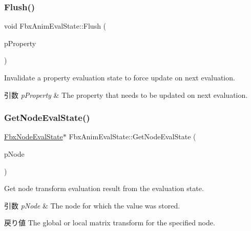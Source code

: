 \subsubsection{\texorpdfstring{Flush()}{Flush()}\hspace{0.1cm}{\footnotesize\ttfamily [2/2]}}
{\footnotesize\ttfamily void Fbx\+Anim\+Eval\+State\+::\+Flush (\begin{DoxyParamCaption}\item[{\hyperlink{class_fbx_property}{Fbx\+Property} \&}]{p\+Property }\end{DoxyParamCaption})}

Invalidate a property evaluation state to force update on next evaluation. 
\begin{DoxyParams}{引数}
{\em p\+Property} & The property that needs to be updated on next evaluation. \\
\hline
\end{DoxyParams}
\mbox{\label{class_fbx_anim_eval_state_a2aedc029a4b2870a2d2112111a450ded}} 
\subsubsection{\texorpdfstring{Get\+Node\+Eval\+State()}{GetNodeEvalState()}}
{\footnotesize\ttfamily \hyperlink{class_fbx_node_eval_state}{Fbx\+Node\+Eval\+State}$\ast$ Fbx\+Anim\+Eval\+State\+::\+Get\+Node\+Eval\+State (\begin{DoxyParamCaption}\item[{\hyperlink{class_fbx_node}{Fbx\+Node} $\ast$}]{p\+Node }\end{DoxyParamCaption})}

Get node transform evaluation result from the evaluation state. 
\begin{DoxyParams}{引数}
{\em p\+Node} & The node for which the value was stored. \\
\hline
\end{DoxyParams}
\begin{DoxyReturn}{戻り値}
The global or local matrix transform for the specified node. 
\end{DoxyReturn}
\mbox{\label{class_fbx_anim_eval_state_aa8ad680f208af36dd8f7864cf3449217}} 

